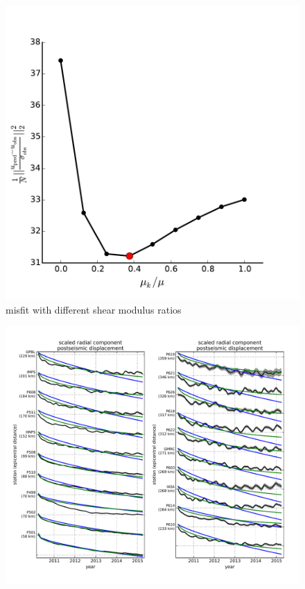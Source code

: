 \documentclass[1p]{elsarticle}
\begin{document}
\begin{figure}
\includegraphics[scale=0.8]{Figures/RatioMisfit}
\centering 
\caption{misfit with different shear modulus ratios}
\label{fig:ShearModulusRatio}
\end{figure}

\begin{figure}
\includegraphics[scale=0.8]{Figures/RecordSectionFinal}
\centering 
\caption{}
\label{fig:RecordSection2}
\end{figure} 
\end{document}

